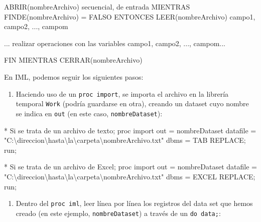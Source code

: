 \documentclass[
]{book}
\newenvironment{Shaded}{\begin{snugshade}}{\end{snugshade}}
\newcommand{\NormalTok}[1]{#1}
\providecommand{\tightlist}{%
  \setlength{\itemsep}{0pt}\setlength{\parskip}{0pt}}
\begin{document}
\begin{Shaded}
\begin{Highlighting}[]
\NormalTok{ABRIR(nombreArchivo) secuencial, de entrada}
\NormalTok{MIENTRAS FINDE(nombreArchivo) = FALSO ENTONCES}
\NormalTok{    LEER(nombreArchivo) campo1, campo2, ..., campom}
    
\NormalTok{    ... realizar operaciones con las variables campo1, campo2, ..., campom...}
    
\NormalTok{FIN MIENTRAS}
\NormalTok{CERRAR(nombreArchivo)}
\end{Highlighting}
\end{Shaded}

En IML, podemos seguir los siguientes pasos:

\begin{enumerate}
\def\labelenumi{\arabic{enumi}.}
\tightlist
\item
  Haciendo uso de un \texttt{proc\ import}, se importa el archivo en la librería temporal \texttt{Work} (podría guardarse en otra), creando un dataset cuyo nombre se indica en \texttt{out} (en este caso, \texttt{nombreDataset}):
\end{enumerate}

\begin{Shaded}
\begin{Highlighting}[]
\NormalTok{* Si se trata de un archivo de texto;}
\NormalTok{proc import out = nombreDataset}
\NormalTok{            datafile = "C:\textbackslash{}direccion\textbackslash{}hasta\textbackslash{}la\textbackslash{}carpeta\textbackslash{}nombreArchivo.txt"}
\NormalTok{            dbms = TAB REPLACE;}
\NormalTok{run;}
            
\NormalTok{* Si se trata de un archivo de Excel;}
\NormalTok{proc import out = nombreDataset}
\NormalTok{            datafile = "C:\textbackslash{}direccion\textbackslash{}hasta\textbackslash{}la\textbackslash{}carpeta\textbackslash{}nombreArchivo.txt"}
\NormalTok{            dbms = EXCEL REPLACE;}
\NormalTok{run;}
\end{Highlighting}
\end{Shaded}

\begin{enumerate}
\def\labelenumi{\arabic{enumi}.}
\setcounter{enumi}{1}
\tightlist
\item
  Dentro del \texttt{proc\ iml}, leer línea por línea los registros del data set que hemos creado (en este ejemplo, \texttt{nombreDataset}) a través de un \texttt{do\ data;}:
\end{enumerate}
\end{document}
